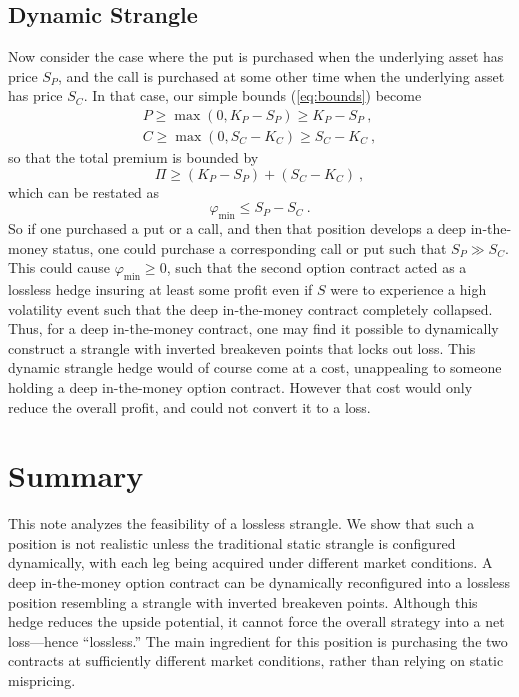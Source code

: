 \documentclass[aps,reprint]{revtex4-2}
\begin{document}
\subsection{Dynamic Strangle}
Now consider the case where the put is purchased when the underlying asset has price $S_P$, and the call is purchased at some other time when the underlying asset has price $S_C$.  In that case, our simple bounds (\ref{eq:bounds}) become
\begin{subequations} \label{eq:dynamicbounds}
\begin{align}
P \ge \max(0, K_P - S_P) \ge K_P - S_P~,\\
C \ge \max(0, S_C - K_C) \ge S_C - K_C~,
\end{align}
\end{subequations}
so that the total premium is bounded by
\begin{equation}
\Pi \ge (K_P - S_P) + (S_C - K_C)~,
\end{equation}
which can be restated as
\begin{equation}
\varphi_{\min} \le S_P - S_C~.
\end{equation}
So if one purchased a put or a call, and then that position develops a deep in-the-money status, one could purchase a corresponding call or put such that $S_P \gg S_C$.  This could cause $\varphi_{\min} \ge 0$, such that the second option contract acted as a lossless hedge insuring at least some profit even if $S$ were to experience a high volatility event such that the deep in-the-money contract completely collapsed.
Thus, for a deep in-the-money contract, one may find it possible to dynamically construct a strangle with inverted breakeven points that locks out loss.  This dynamic strangle hedge would of course come at a cost, unappealing to someone holding a deep in-the-money option contract. However that cost would only reduce the overall profit, and could not convert it to a loss.

\section{Summary}

This note analyzes the feasibility of a lossless strangle. We show that such a position is not realistic unless the traditional static strangle is configured dynamically, with each leg being acquired under different market conditions.  A deep in-the-money option contract can be dynamically reconfigured into a lossless position resembling a strangle with inverted breakeven points.  Although this hedge reduces the upside potential, it cannot force the overall strategy into a net loss—hence “lossless.”  The main ingredient for this position is purchasing the two contracts at sufficiently different market conditions, rather than relying on static mispricing.
\end{document}
